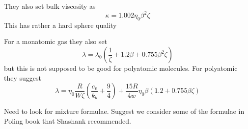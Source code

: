 \documentclass[11pt]{article}
\begin{document}
They also set bulk viscosity as
\[
\kappa = 1.002 \eta_0 \beta^2 \zeta
\]
This has rather a hard sphere quality

For a monatomic gas they also set
\[
\lambda = \lambda_0 (\frac{1}{\zeta} + 1.2 \beta + 0.755 \beta^2 \zeta)
\]
but this is not supposed to be good for polyatomic molecules.
For polyatomic they suggest
\[
\lambda = \eta_0 \frac{R}{W \zeta} \left(\frac{c_v}{k_b} + \frac{9}{4} \right)
+ \frac{15 R}{4 w} \eta_0 \beta \left( 1.2 + 0.755 \beta \zeta \right ) 
\]

Need to look for mixture formulae.  Suggest we consider some of the formulae in Poling book that Shashank
recommended.



\end{document}
